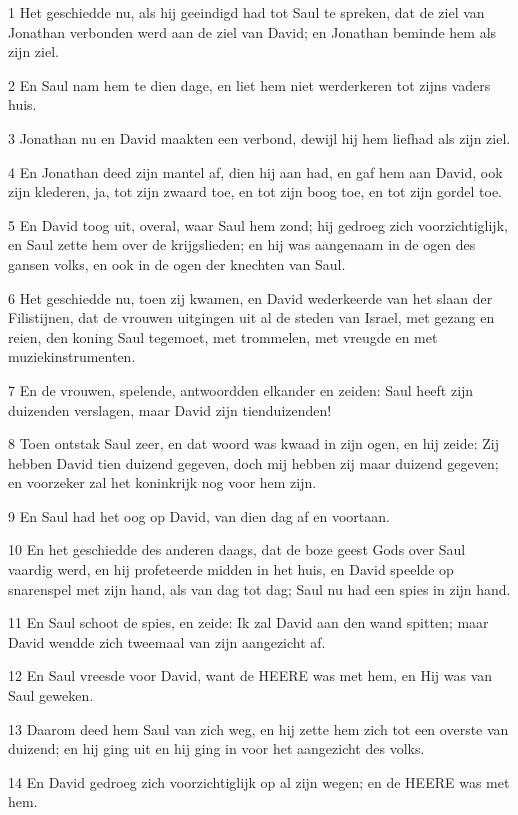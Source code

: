 \par 1 Het geschiedde nu, als hij geeindigd had tot Saul te spreken, dat de ziel van Jonathan verbonden werd aan de ziel van David; en Jonathan beminde hem als zijn ziel.
\par 2 En Saul nam hem te dien dage, en liet hem niet werderkeren tot zijns vaders huis.
\par 3 Jonathan nu en David maakten een verbond, dewijl hij hem liefhad als zijn ziel.
\par 4 En Jonathan deed zijn mantel af, dien hij aan had, en gaf hem aan David, ook zijn klederen, ja, tot zijn zwaard toe, en tot zijn boog toe, en tot zijn gordel toe.
\par 5 En David toog uit, overal, waar Saul hem zond; hij gedroeg zich voorzichtiglijk, en Saul zette hem over de krijgslieden; en hij was aangenaam in de ogen des gansen volks, en ook in de ogen der knechten van Saul.
\par 6 Het geschiedde nu, toen zij kwamen, en David wederkeerde van het slaan der Filistijnen, dat de vrouwen uitgingen uit al de steden van Israel, met gezang en reien, den koning Saul tegemoet, met trommelen, met vreugde en met muziekinstrumenten.
\par 7 En de vrouwen, spelende, antwoordden elkander en zeiden: Saul heeft zijn duizenden verslagen, maar David zijn tienduizenden!
\par 8 Toen ontstak Saul zeer, en dat woord was kwaad in zijn ogen, en hij zeide: Zij hebben David tien duizend gegeven, doch mij hebben zij maar duizend gegeven; en voorzeker zal het koninkrijk nog voor hem zijn.
\par 9 En Saul had het oog op David, van dien dag af en voortaan.
\par 10 En het geschiedde des anderen daags, dat de boze geest Gods over Saul vaardig werd, en hij profeteerde midden in het huis, en David speelde op snarenspel met zijn hand, als van dag tot dag; Saul nu had een spies in zijn hand.
\par 11 En Saul schoot de spies, en zeide: Ik zal David aan den wand spitten; maar David wendde zich tweemaal van zijn aangezicht af.
\par 12 En Saul vreesde voor David, want de HEERE was met hem, en Hij was van Saul geweken.
\par 13 Daarom deed hem Saul van zich weg, en hij zette hem zich tot een overste van duizend; en hij ging uit en hij ging in voor het aangezicht des volks.
\par 14 En David gedroeg zich voorzichtiglijk op al zijn wegen; en de HEERE was met hem.

